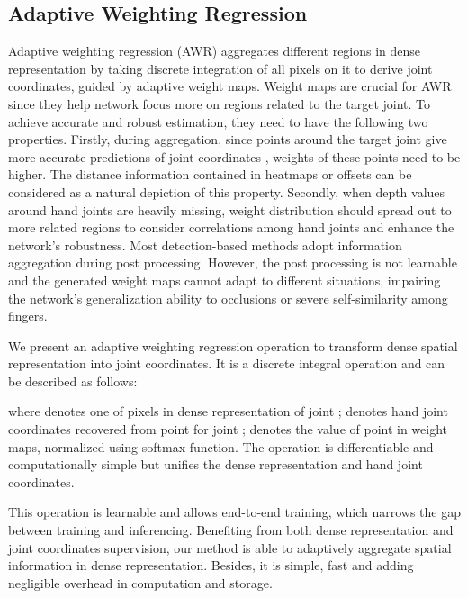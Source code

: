 \documentclass[letterpaper]{article} \usepackage{aaai20}  \usepackage{times}  \usepackage{helvet} \usepackage{courier}  \usepackage[hyphens]{url}  \usepackage{graphicx} \usepackage{amsmath}
\begin{document}
\subsection{Adaptive Weighting Regression}
Adaptive weighting regression (AWR) aggregates different regions in dense representation by taking discrete integration of all pixels on it to derive joint coordinates, guided by adaptive weight maps. Weight maps are crucial for AWR since they help network focus more on regions related to the target joint. To achieve accurate and robust estimation, they need to have the following two properties. Firstly, during aggregation, since points around the target joint give more accurate predictions of joint coordinates \cite{point2pose}, weights of these points need to be higher. The distance information contained in heatmaps or offsets can be considered as a natural depiction of this property. Secondly, when depth values around hand joints are heavily missing, weight distribution should spread out to more related regions to consider correlations among hand joints and enhance the network's robustness. Most detection-based methods adopt information aggregation during post processing. However, the post processing is not learnable and the generated weight maps cannot adapt to different situations, impairing the network's generalization ability to occlusions or severe self-similarity among fingers. 

\parskip=0pt

We present an adaptive weighting regression operation to transform dense spatial representation into joint coordinates. It is a discrete integral operation and can be described as follows:

\parskip=0pt

\begin{small}

\end{small}

\noindent where  denotes one of  pixels in dense representation of joint ;  denotes hand joint coordinates recovered from point  for joint ;  denotes the value of point  in weight maps, normalized using softmax function. The operation is differentiable and computationally simple but unifies the dense representation and hand joint coordinates.

This operation is learnable and allows end-to-end training, which narrows the gap between training and inferencing. Benefiting from both dense representation and joint coordinates supervision, our method is able to adaptively aggregate spatial information in dense representation. Besides, it is simple, fast and adding negligible overhead in computation and storage.
\end{document}
